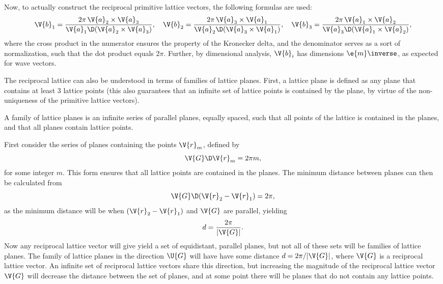 \documentclass[main.tex]{subfiles}
\begin{document}
	Now, to actually construct the reciprocal primitive lattice vectors, the following formulas are used:
	\begin{equation}\label{eq:rec_prim_vec}
		\V{b}_1 = \frac{2\pi \, \V{a}_2 \times \V{a}_3}{\V{a}_1 \D (\V{a}_2 \times \V{a}_3)}, \quad \V{b}_2 = \frac{2\pi \, \V{a}_3 \times \V{a}_1}{\V{a}_2 \D (\V{a}_3 \times \V{a}_1)}, \quad \V{b}_3 = \frac{2\pi \, \V{a}_1 \times \V{a}_2}{\V{a}_3 \D (\V{a}_1 \times \V{a}_2)},
	\end{equation}
	where the cross product in the numerator ensures the property of the Kronecker delta, and the denominator serves as a sort of normalization, such that the dot product equals 2$ \pi $. Further, by dimensional analysis, $ \V{b}_i $ has dimensions $ \e{m}\inverse $, as expected for wave vectors.
	
	The reciprocal lattice can also be understood in terms of families of lattice planes. First, a lattice plane is defined as any plane that contains at least 3 lattice points (this also guarantees that an infinite set of lattice points is contained by the plane, by virtue of the non-uniqueness of the primitive lattice vectors). 
	
	A family of lattice planes is an infinite series of parallel planes, equally spaced, such that all points of the lattice is contained in the planes, and that all planes contain lattice points.
	
	First consider the series of planes containing the points $ \V{r}_m $, defined by
	\begin{equation}
		\V{G} \D \V{r}_m = 2\pi m,
	\end{equation}
	for some integer $ m $. This form ensures that all lattice points are contained in the planes. The minimum distance between planes can then be calculated from
	\begin{equation}
		\V{G} \D (\V{r}_2 - \V{r}_1) = 2\pi,
	\end{equation}
	as the minimum distance will be when $ (\V{r}_2-\V{r}_1) $ and $ \V{G} $ are parallel, yielding
	\begin{equation}
		d = \frac{2\pi}{|\V{G}|}.
	\end{equation}
	Now any reciprocal lattice vector will give yield a set of equidistant, parallel planes, but not all of these sets will be families of lattice planes. The family of lattice planes in the direction $ \U{G} $ will have have some distance $ d = 2\pi /|\V{G}| $, where $ \V{G} $ is a reciprocal lattice vector. An infinite set of reciprocal lattice vectors share this direction, but increasing the magnitude of the reciprocal lattice vector $ \V{G} $ will decrease the distance between the set of planes, and at some point there will be planes that do not contain any lattice points.
	
\end{document}

